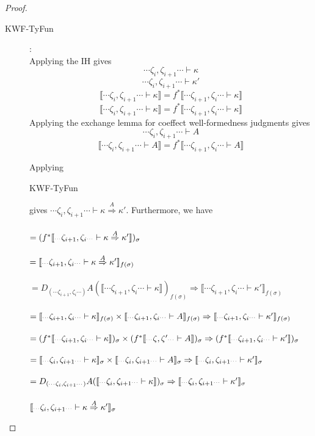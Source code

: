 \documentclass{article}
\newcommand{\sem}[1]{\llbracket #1 \rrbracket}
\newcommand{\scdots}{\scalebox{0.6}{$\cdots$}}
\begin{document}
\begin{proof}
\begin{description}
\item[KWF-TyFun]:~\\

Applying the IH gives $$\cdots \zeta_i,\zeta_{i+1} \cdots \vdash \kappa$$ $$\cdots \zeta_i,\zeta_{i+1} \cdots \vdash \kappa'$$ $$\sem{\cdots \zeta_i,\zeta_{i+1} \cdots \vdash \kappa} = f^*\sem{\cdots \zeta_{i+1},\zeta_i \cdots \vdash \kappa}$$ $$\sem{\cdots \zeta_i,\zeta_{i+1} \cdots \vdash \kappa} = f^*\sem{\cdots \zeta_{i+1},\zeta_i \cdots \vdash \kappa} $$
Applying the exchange lemma for coeffect well-formedness judgments gives $$\cdots \zeta_{i},\zeta_{i+1} \cdots \vdash A$$ $$\sem{\cdots \zeta_i,\zeta_{i+1} \cdots \vdash A} = f^*\sem{\cdots \zeta_{i+1},\zeta_i \cdots \vdash A} $$

Applying \begin{sc}KWF-TyFun\end{sc} gives $\cdots \zeta_i,\zeta_{i+1} \cdots \vdash \kappa \overset{A}{\Rightarrow} \kappa'$. Furthermore, we have\\~\\
$= (f^* \sem{\scdots \zeta_{i+1},\zeta_i \scdots \vdash \kappa \overset{A}{\Rightarrow} \kappa'})_\sigma$\\~\\
$= \sem{\scdots \zeta_{i+1},\zeta_i \scdots \vdash \kappa \overset{A}{\Rightarrow} \kappa'}_{f(\sigma)}$\\~\\
$= D_{(\cdots \zeta_{i+1},\zeta_i \cdots)} A(\sem{\cdots \zeta_{i+1},\zeta_i \cdots \vdash \kappa})_{f(\sigma)} \Rightarrow \sem{\cdots \zeta_{i+1},\zeta_i \cdots \vdash \kappa'}_{f(\sigma)}$\\~\\
$= \sem{\scdots \zeta_{i+1},\zeta_i \scdots \vdash \kappa}_{f(\sigma)} \times \sem{\scdots \zeta_{i+1},\zeta_i \scdots \vdash A}_{f(\sigma)} \Rightarrow \sem{\scdots \zeta_{i+1},\zeta_i \scdots \vdash \kappa'}_{f(\sigma)}$\\~\\
$= (f^* \sem{\scdots \zeta_{i+1},\zeta_i \scdots \vdash \kappa})_\sigma \times (f^*\sem{\scdots \zeta,\zeta' \scdots \vdash A})_{\sigma} \Rightarrow (f^* \sem{\scdots \zeta_{i+1},\zeta_i \scdots \vdash \kappa'})_\sigma$\\~\\
$= \sem{\scdots \zeta_{i},\zeta_{i+1} \scdots \vdash \kappa}_\sigma \times \sem{\scdots \zeta_i,\zeta_{i+1} \scdots \vdash A}_{\sigma} \Rightarrow \sem{\scdots \zeta_i,\zeta_{i+1} \scdots \vdash \kappa'}_\sigma$\\~\\
$= D_{(\scdots \zeta_i,\zeta_{i+1} \scdots)} A(\sem{\scdots \zeta_{i},\zeta_{i+1} \scdots \vdash \kappa})_\sigma \Rightarrow \sem{\scdots \zeta_{i},\zeta_{i+1} \scdots \vdash \kappa'}_\sigma$\\~\\
$\sem{\scdots \zeta_i,\zeta_{i+1} \scdots \vdash \kappa \overset{A}{\Rightarrow} \kappa'}_\sigma$\\


\end{description}
\end{proof}
\end{document}
